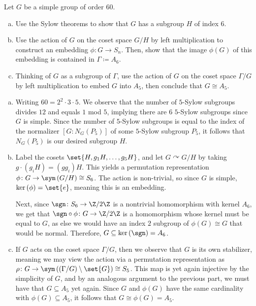 \documentclass[10pt]{mypackage}
\renewcommand{\coloneq}{\coloneqq}
\begin{document}
\begin{problem}[Problem 2]
  Let $G$ be a simple group of order $60$.
  \begin{enumerate}[(a)]
    \item Use the Sylow theorems to show that $G$ has a subgroup $H$ of index $6$.
    \item Use the action of $G$ on the coset space $G/H$ by left multiplication to construct an embedding $\phi\colon G\rightarrow S_n$. Then, show that the image $\phi(G)$ of this embedding is contained in $\Gamma\coloneq A_6$.
    \item Thinking of $G$ as a subgroup of $\Gamma$, use the action of $G$ on the coset space $\Gamma/G$ by left multiplication to embed $G$ into $A_5$, then conclude that $G\cong A_5$.
  \end{enumerate}
\end{problem}
\begin{solution}\hfill
  \begin{enumerate}[(a)]
    \item Writing $60 = 2^2\cdot 3 \cdot 5$. We observe that the number of $5$-Sylow subgroups divides $12$ and equals $1$ mod $5$, implying there are $6$ $5$-Sylow subgroups since $G$ is simple. Since the number of $5$-Sylow subgroups is equal to the index of the normalizer $\left[ G:N_G\left( P_5 \right) \right]$ of some $5$-Sylow subgroup $P_5$, it follows that $N_G\left( P_5 \right)$ is our desired subgroup $H$.
    \item Label the cosets $\set{H,g_1H,\dots,g_5H}$, and let $G\curvearrowright G/H$ by taking $g\cdot \left( g_iH \right) = \left( gg_i \right)H$. This yields a permutation representation $\phi\colon G\rightarrow \sym\left( G/H \right)\cong S_6$. The action is non-trivial, so since $G$ is simple, $\ker\left( \phi \right) = \set{e}$, meaning this is an embedding.

      Next, since $\sgn\colon S_6\rightarrow \Z/2\Z$ is a nontrivial homomorphism with kernel $A_6$, we get that $\sgn\circ\phi\colon G\rightarrow \Z/2\Z$ is a homomorphism whose kernel must be equal to $G$, as else we would have an index $2$ subgroup of $\phi(G)\cong G$ that would be normal. Therefore, $G\subseteq \ker\left( \sgn \right) = A_6$.
    \item If $G$ acts on the coset space $\Gamma/G$, then we observe that $G$ is its own stabilizer, meaning we may view the action via a permutation representation as $\rho\colon G \rightarrow \sym\left( \left( \Gamma/G \right)\setminus \set{G} \right)\cong S_5$. This map is yet again injective by the simplicity of $G$, and by an analogous argument to the previous part, we must have that $G\subseteq A_5$ yet again. Since $G$ and $\phi(G)$ have the same cardinality with $\phi(G)\subseteq A_5$, it follows that $G\cong \phi(G) = A_5$.
  \end{enumerate}
\end{solution}
\end{document}
